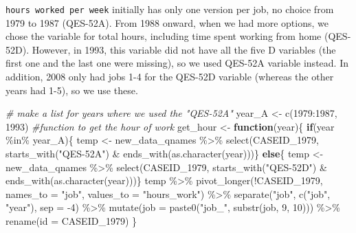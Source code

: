 \documentclass{article}
\newenvironment{Shaded}{\begin{snugshade}}{\end{snugshade}}
\newcommand{\AttributeTok}[1]{\textcolor[rgb]{0.77,0.63,0.00}{#1}}
\newcommand{\CommentTok}[1]{\textcolor[rgb]{0.56,0.35,0.01}{\textit{#1}}}
\newcommand{\ControlFlowTok}[1]{\textcolor[rgb]{0.13,0.29,0.53}{\textbf{#1}}}
\newcommand{\DecValTok}[1]{\textcolor[rgb]{0.00,0.00,0.81}{#1}}
\newcommand{\FunctionTok}[1]{\textcolor[rgb]{0.00,0.00,0.00}{#1}}
\newcommand{\NormalTok}[1]{#1}
\newcommand{\OtherTok}[1]{\textcolor[rgb]{0.56,0.35,0.01}{#1}}
\newcommand{\SpecialCharTok}[1]{\textcolor[rgb]{0.00,0.00,0.00}{#1}}
\newcommand{\StringTok}[1]{\textcolor[rgb]{0.31,0.60,0.02}{#1}}
\begin{document}
\texttt{hours\ worked\ per\ week} initially has only one version per job, no choice from 1979 to 1987 (QES-52A). From 1988 onward, when we had more options, we chose the variable for total hours, including time spent working from home (QES-52D). However, in 1993, this variable did not have all the five D variables (the first one and the last one were missing), so we used QES-52A variable instead. In addition, 2008 only had jobs 1-4 for the QES-52D variable (whereas the other years had 1-5), so we use these.

\begin{Shaded}
\begin{Highlighting}[]
\CommentTok{\# make a list for years where we used the "QES{-}52A"}
\NormalTok{year\_A }\OtherTok{\textless{}{-}} \FunctionTok{c}\NormalTok{(}\DecValTok{1979}\SpecialCharTok{:}\DecValTok{1987}\NormalTok{, }\DecValTok{1993}\NormalTok{)}
\CommentTok{\#function to get the hour of work}
\NormalTok{get\_hour }\OtherTok{\textless{}{-}} \ControlFlowTok{function}\NormalTok{(year)\{}
  \ControlFlowTok{if}\NormalTok{(year }\SpecialCharTok{\%in\%}\NormalTok{ year\_A)\{}
\NormalTok{    temp }\OtherTok{\textless{}{-}}\NormalTok{ new\_data\_qnames }\SpecialCharTok{\%\textgreater{}\%}
      \FunctionTok{select}\NormalTok{(CASEID\_1979,}
                    \FunctionTok{starts\_with}\NormalTok{(}\StringTok{"QES{-}52A"}\NormalTok{) }\SpecialCharTok{\&}
                      \FunctionTok{ends\_with}\NormalTok{(}\FunctionTok{as.character}\NormalTok{(year)))\}}
  \ControlFlowTok{else}\NormalTok{\{}
\NormalTok{    temp }\OtherTok{\textless{}{-}}\NormalTok{ new\_data\_qnames }\SpecialCharTok{\%\textgreater{}\%}
      \FunctionTok{select}\NormalTok{(CASEID\_1979,}
                    \FunctionTok{starts\_with}\NormalTok{(}\StringTok{"QES{-}52D"}\NormalTok{) }\SpecialCharTok{\&}
                      \FunctionTok{ends\_with}\NormalTok{(}\FunctionTok{as.character}\NormalTok{(year)))\}}
\NormalTok{  temp }\SpecialCharTok{\%\textgreater{}\%}
    \FunctionTok{pivot\_longer}\NormalTok{(}\SpecialCharTok{!}\NormalTok{CASEID\_1979,}
                 \AttributeTok{names\_to =} \StringTok{"job"}\NormalTok{,}
                 \AttributeTok{values\_to =} \StringTok{"hours\_work"}\NormalTok{) }\SpecialCharTok{\%\textgreater{}\%}
    \FunctionTok{separate}\NormalTok{(}\StringTok{"job"}\NormalTok{, }\FunctionTok{c}\NormalTok{(}\StringTok{"job"}\NormalTok{, }\StringTok{"year"}\NormalTok{), }\AttributeTok{sep =} \SpecialCharTok{{-}}\DecValTok{4}\NormalTok{) }\SpecialCharTok{\%\textgreater{}\%}
    \FunctionTok{mutate}\NormalTok{(}\AttributeTok{job =} \FunctionTok{paste0}\NormalTok{(}\StringTok{"job\_"}\NormalTok{, }\FunctionTok{substr}\NormalTok{(job, }\DecValTok{9}\NormalTok{, }\DecValTok{10}\NormalTok{))) }\SpecialCharTok{\%\textgreater{}\%}
    \FunctionTok{rename}\NormalTok{(}\AttributeTok{id =}\NormalTok{ CASEID\_1979)}
\NormalTok{\}}


\end{Highlighting}
\end{Shaded}
\end{document}
